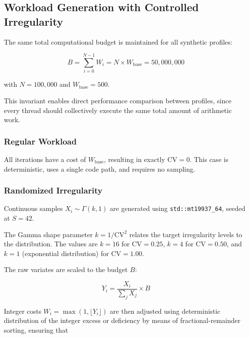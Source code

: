\documentclass[conference]{IEEEtran}
\begin{document}
\subsection{Workload Generation with Controlled Irregularity}

The same total computational budget is maintained for all synthetic profiles:

\begin{equation}
B = \sum_{i=0}^{N-1} W_i
= N \times W_{\text{base}}
= 50{,}000{,}000
\label{eq:budget}
\end{equation}

with \(N = 100{,}000\) and \(W_{\text{base}} = 500\).

This invariant enables direct performance comparison between profiles, since every thread should collectively execute the same total amount of arithmetic work.

\subsubsection{Regular Workload}

All iterations have a cost of \(W_{\text{base}}\), resulting in exactly \(\mathrm{CV} = 0\). This case is deterministic, uses a single code path, and requires no sampling.

\subsubsection{Randomized Irregularity}

Continuous samples \(X_i \sim \Gamma(k,1)\) are generated using \texttt{std::mt19937\_64}, seeded at \(S = 42\).

The Gamma shape parameter \(k = 1/\mathrm{CV}^2\) relates the target irregularity levels to the distribution. The values are \(k = 16\) for \(\mathrm{CV} = 0.25\), \(k = 4\) for \(\mathrm{CV} = 0.50\), and \(k = 1\) (exponential distribution) for \(\mathrm{CV} = 1.00\).

The raw variates are scaled to the budget \(B\):

\begin{equation}
Y_i = \frac{X_i}{\sum_j X_j} \times B
\label{eq:scale}
\end{equation}

Integer costs \(W_i = \max(1,\lfloor Y_i \rfloor)\) are then adjusted using deterministic distribution of the integer excess or deficiency by means of fractional-remainder sorting, ensuring that
\end{document}
